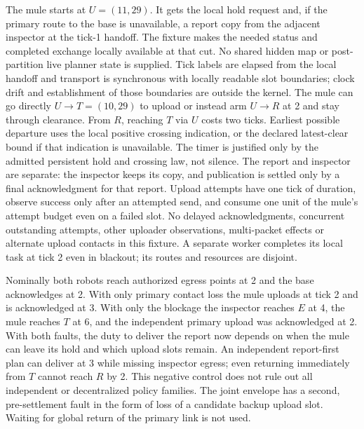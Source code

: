 \documentclass[11pt]{article}
\begin{document}
The mule starts at \(U=(11,29)\). It gets the local hold request and, if
the primary route to the base is unavailable, a report copy from the
adjacent inspector at the tick-1 handoff. The fixture makes the needed
status and completed exchange locally available at that cut. No shared
hidden map or post-partition live planner state is supplied. Tick labels
are elapsed from the local handoff and transport is synchronous with
locally readable slot boundaries; clock drift and establishment of those
boundaries are outside the kernel. The mule can go directly \(U\to T=(10,29)\)
to upload or instead arm \(U\to R\) at 2 and stay through clearance. From
\(R\), reaching \(T\) via \(U\) costs two ticks. Earliest possible departure
uses the local positive crossing indication, or the declared latest-clear
bound if that indication is unavailable. The timer is justified only by
the admitted persistent hold and crossing law, not silence. The report
and inspector are separate: the inspector keeps its copy, and publication
is settled only by a final acknowledgment for that report. Upload attempts
have one tick of duration, observe success only after an attempted send,
and consume one unit of the mule's attempt budget even on a failed slot.
No delayed acknowledgments, concurrent outstanding attempts, other
uploader observations, multi-packet effects or alternate upload contacts
in this fixture. A separate worker completes its local task at tick 2
even in blackout; its routes and resources are disjoint.

Nominally both robots reach authorized egress points at 2 and the base
acknowledges at 2. With only primary contact loss the mule uploads at
tick 2 and is acknowledged at 3. With only the blockage the inspector
reaches \(E\) at 4, the mule reaches \(T\) at 6, and the independent
primary upload was acknowledged at 2. With both faults, the duty to
deliver the report now depends on when the mule can leave its hold and
which upload slots remain. An independent report-first plan can deliver
at 3 while missing inspector egress; even returning immediately from
\(T\) cannot reach \(R\) by 2. This negative control does not rule out
all independent or decentralized policy families. The joint envelope
has a second, pre-settlement fault in the form of loss of a candidate
backup upload slot. Waiting for global return of the primary link is
not used.
\end{document}
